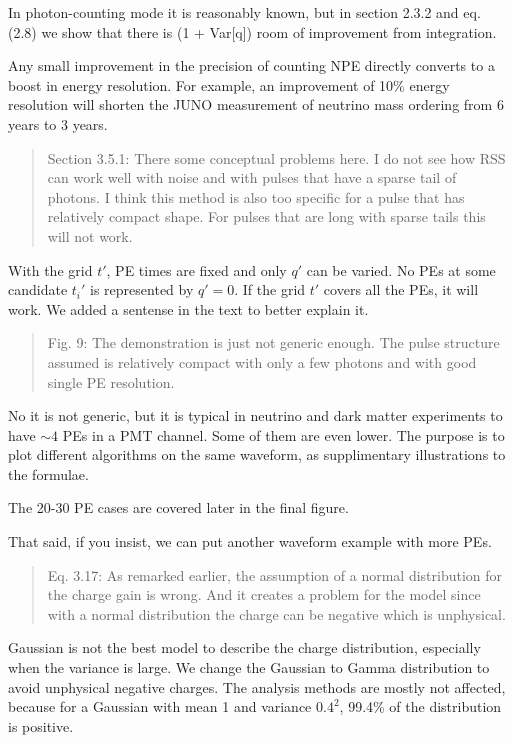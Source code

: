 \documentclass[12pt]{article}
\begin{document}
In photon-counting mode it is reasonably known, but in section 2.3.2 and eq. (2.8) we show that there is (1 + Var[q]) room of improvement from integration.

Any small improvement in the precision of counting NPE directly converts to a boost in energy resolution. For example, an improvement of 10\% energy resolution will shorten the JUNO measurement of neutrino mass ordering from 6 years to 3 years.

\begin{quote}
Section 3.5.1: There some conceptual problems here. I do not see how RSS can work well with noise and with pulses that have a sparse tail of photons. I think this method is also too specific for a pulse that has relatively compact shape. For pulses that are long with sparse tails this will not work.
\end{quote}

With the grid $t'$, PE times are fixed and only $q'$ can be varied.  No PEs at some candidate $t_i'$ is represented by $q'=0$.  If the grid $t'$ covers all the PEs, it will work.  We added a sentense in the text to better explain it.

\begin{quote}
Fig. 9: The demonstration is just not generic enough. The pulse structure assumed is relatively compact with only a few photons and with good single PE resolution.
\end{quote}

No it is not generic, but it is typical in neutrino and dark matter experiments to have $\sim 4$ PEs in a PMT channel.  Some of them are even lower. The purpose is to plot different algorithms on the same waveform, as supplimentary illustrations to the formulae.

The 20-30 PE cases are covered later in the final figure.

That said, if you insist, we can put another waveform example with more PEs.

\begin{quote}
Eq. 3.17: As remarked earlier, the assumption of a normal distribution for the charge gain is wrong. And it creates a problem for the model since with a normal distribution the charge can be negative which is unphysical.
\end{quote}

Gaussian is not the best model to describe the charge distribution, especially when the variance is large. We change the Gaussian to Gamma distribution to avoid unphysical negative charges. The analysis methods are mostly not affected, because for a Gaussian with mean 1 and variance $0.4^2$, 99.4\% of the distribution is positive.
\end{document}
